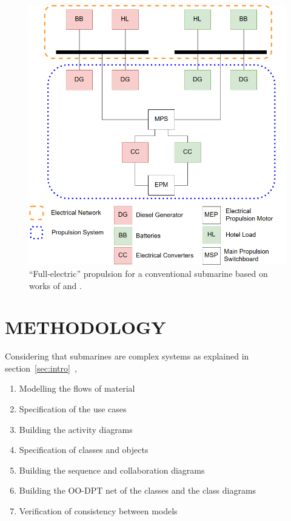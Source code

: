 \documentclass[10pt,fleqn,a4paper,twoside]{article}
\begin{document}
	\begin{figure}[h!]
		\centering
		\includegraphics[angle=0, scale=0.400]{prop_arch.png}
		\caption{``Full-electric'' propulsion for a conventional submarine based on works of \citet{Geertsma2017} and \citet{Pereira2016}.}
		\label{fig:full}
	\end{figure}
	
	
	\section{METHODOLOGY}
	\label{sec:method}
	
	
	Considering that submarines are complex systems as explained in section~\ref{sec:intro}\ , \citet{Villani2004}
	
	\begin{enumerate}
		\item Modelling the flows of material
		\item Specification of the use cases
		\item Building the activity diagrams
		\item Specification of classes and objects
		\item Building the sequence and collaboration diagrams
		\item Building the OO-DPT net of the classes and the class diagrams
		\item Verification of consistency between models
	\end{enumerate}
	
\end{document}
